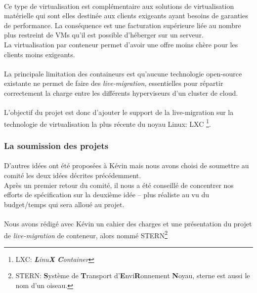\paragraph*{}
Ce type de virtualisation est complémentaire aux solutions de virtualisation matérielle qui sont elles destinée aux clients exigeants ayant besoins de garanties
de performance. La conséquence est une facturation supérieure liée au nombre plus restreint de VMs qu'il est possible d'héberger sur un serveur.
\\
La virtualisation par conteneur permet d'avoir une offre moins chère pour les clients moins exigeants.

\paragraph*{}
La principale limitation des containeurs est qu'aucune technologie open-source existante ne permet de faire des \emph{live-migration}, essentielles pour répartir correctement
la charge entre les différents hyperviseurs d'un cluster de cloud.

\paragraph*{}
L'objectif du projet est donc d'ajouter le support de la live-migration sur la technologie de virtualisation la plus récente du noyau Linux: LXC
\footnote{LXC: \emph{\textbf{L}inu\textbf{X} \textbf{C}ontainer}}.


\subsubsection{La soumission des projets}
\paragraph*{}
D'autres idées ont été proposées à Kévin mais nous avons choisi de soumettre au comité les deux idées décrites précédemment.
\\
Après un premier retour du comité, il nous a été conseillé de concentrer nos efforts de spécification sur la deuxième idée -- plus réaliste au vu du budget/temps qui sera alloué au projet.

\paragraph*{}
Nous avons rédigé avec Kévin un cahier des charges et une présentation du projet de \emph{live-migration} de conteneur, alors nommé STERN\footnote{STERN:
\textbf{S}ystème de \textbf{T}ransport d'\textbf{E}nvi\textbf{R}onnement \textbf{N}oyau, sterne est aussi le nom d'un oiseau.}

